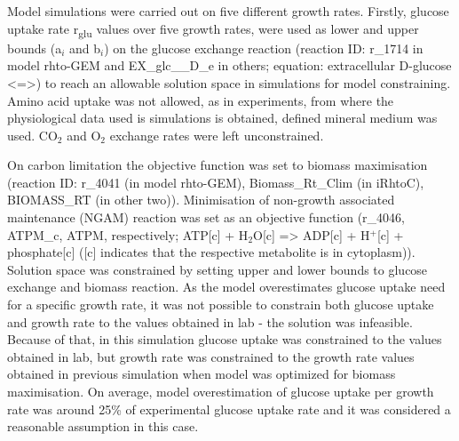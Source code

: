 Model simulations were carried out on five different growth rates.
Firstly, glucose uptake rate \unit{r_{glu}} values
over five growth rates, were used as lower and upper bounds (a$_i$ and b$_i$) on the glucose exchange reaction (reaction ID: r\_1714 in model rhto-GEM and EX\_glc\_\_D\_e in others; equation: extracellular D-glucose <=>) to reach an allowable solution space
in simulations for model constraining. Amino acid uptake was not allowed, as in experiments, from where the physiological data used is simulations is obtained, defined mineral medium was used. CO$_2$ and O$_2$ exchange rates were left unconstrained.

On carbon limitation the objective function was set to biomass maximisation (reaction ID: r\_4041 (in model rhto-GEM), Biomass\_Rt\_Clim (in iRhtoC), BIOMASS\_RT (in other two)).
Minimisation of non-growth associated maintenance (NGAM) reaction was set as an objective function (r\_4046, ATPM\_c, ATPM, respectively; ATP[c] + H$_2$O[c] => ADP[c] + H$^+$[c] + phosphate[c] ([c] indicates that the respective metabolite is in cytoplasm)). Solution space was constrained by setting upper and lower bounds to glucose exchange and biomass reaction. 
As the model overestimates glucose uptake need for a specific growth rate, it was not possible to constrain both glucose uptake and growth rate to the values obtained in lab - the solution was infeasible. Because of that, in this simulation glucose uptake was constrained to the values obtained in lab, but growth rate was constrained to the growth rate values obtained in previous simulation when model was optimized for biomass maximisation. On average, model overestimation of glucose uptake per growth rate was around 25\% of experimental glucose uptake rate and it was considered a reasonable assumption in this case.

